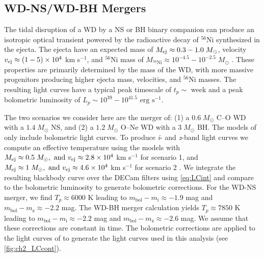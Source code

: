\subsection{WD-NS/WD-BH Mergers}
\label{sec:ch2_WDmerge}
The tidal disruption of a WD by a NS or BH binary companion can produce an isotropic optical transient powered by the radioactive decay of ${}^{56}$Ni synthesized in the ejecta. The ejecta have an expected mass of $M_{\rm ej} \approx 0.3-1.0 \; M_{\odot}$, velocity $v_{\rm ej} \approx (1-5) \times 10^4$ km s$^{-1}$, and $^{56}$Ni mass of $M_{\text{$^{56}$Ni}} \approx 10^{-4.5} - 10^{-2.5}\;M_{\odot}$ \citep{Metzger2012}. These properties are primarily determined by the mass of the WD, with more massive progenitors producing higher ejecta mass, velocities, and $^{56}$Ni masses. The resulting light curves have a typical peak timescale of $t_p \sim $ week and a peak bolometric luminosity of $L_p \sim 10^{39} - 10^{41.5} \text{ erg s}^{-1}$.

The two scenarios we consider here are the merger of: (1) a $0.6\;M_{\odot}$ C--O WD with a $1.4\;M_{\odot}$ NS, and (2) a $1.2\;M_{\odot}$ O--Ne WD with a $3\;M_{\odot}$ BH. The models of \citet{Metzger2012} only include bolometric light curves. To produce {\em i}- and {\em z}-band light curves we compute an effective temperature using the  models with $M_{\rm ej} \approx 0.5\;M_{\odot},\text{ and }v_{\rm ej} \approx 2.8\times10^4$ km s$^{-1}$ for scenario 1, and $M_{\rm ej} \approx 1\;M_{\odot},\text{ and } v_{\rm ej} \approx 4.6\times10^4$ km s$^{-1}$ for scenario 2 \citep[see Figure 7 of][]{Metzger2012}. We integrate the resulting blackbody curve over the DECam filters using \autoref{eq:LCint} and compare to the bolometric luminosity to generate bolometric corrections. For the WD-NS merger, we find $T_p \approx 6000$ K leading to $m_{\text{bol}} - m_{\text{i}} \approx -1.9$ mag and $m_{\text{bol}} - m_{\text{z}} \approx -2.2$ mag. The WD-BH merger calculation yields $T_p \approx 7850$ K leading to $m_{\text{bol}} - m_{\text{i}} \approx -2.2$ mag and $m_{\text{bol}} - m_{\text{z}} \approx -2.6$ mag. We assume that these corrections are constant in time. The bolometric corrections are applied to the light curves of \citet{Metzger2012} to generate the light curves used in this analysis (see \autoref{fig:ch2_LCcont}).

